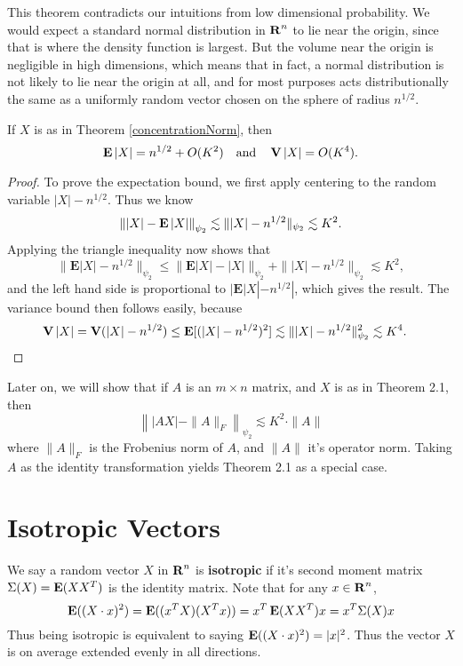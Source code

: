 This theorem contradicts our intuitions from low dimensional probability. We would expect a standard normal distribution in $\operatorname{\mathbf{R}}^n$ to lie near the origin, since that is where the density function is largest. But the volume near the origin is negligible in high dimensions, which means that in fact, a normal distribution is not likely to lie near the origin at all, and for most purposes acts distributionally the same as a uniformly random vector chosen on the sphere of radius $n^{1/2}$.

\begin{corollary}
    If $X$ is as in Theorem \ref{concentrationNorm}, then
    \[ \operatorname{\mathbf{E}} |X| = n^{1/2} + O(K^2)\quad\text{and}\quad\operatorname{\mathbf{V}} |X| = O(K^4). \]
\end{corollary}
\begin{proof}
    To prove the expectation bound, we first apply centering to the random variable $|X| - n^{1/2}$. Thus we know
    \[ \left\| |X| - \operatorname{\mathbf{E}} |X| \right\|_{\psi_2} \lesssim \| |X| - n^{1/2} \|_{\psi_2} \lesssim K^2. \]
    Applying the triangle inequality now shows that
    \[ \| \mathbf{E} |X| - n^{1/2} \|_{\psi_2} \leq \| \mathbf{E} |X| - |X| \|_{\psi_2} + \| |X| - n^{1/2} \|_{\psi_2} \lesssim K^2, \]
    and the left hand side is proportional to $| \mathbf{E} |X| - n^{1/2} |$, which gives the result. The variance bound then follows easily, because
    \begin{align*}
        \operatorname{\mathbf{V}} |X| &= \operatorname{\mathbf{V}}(|X| - n^{1/2}) \leq \operatorname{\mathbf{E}}[(|X| - n^{1/2})^2] \lesssim \| |X| - n^{1/2} \|_{\psi_2}^2 \lesssim K^4. \qedhere
    \end{align*}
\end{proof}

Later on, we will show that if $A$ is an $m \times n$ matrix, and $X$ is as in Theorem 2.1, then
%
\[ \left\| |AX| - \| A \|_F \right\|_{\psi_2} \lesssim K^2 \cdot \| A \| \]
%
where $\| A \|_F$ is the Frobenius norm of $A$, and $\| A \|$ it's operator norm. Taking $A$ as the identity transformation yields Theorem 2.1 as a special case.

\section{Isotropic Vectors}

We say a random vector $X$ in $\operatorname{\mathbf{R}}^n$ is \textbf{isotropic} if it's second moment matrix $\Sigma(X) = \operatorname{\mathbf{E}}(XX^T)$ is the identity matrix. Note that for any $x \in \operatorname{\mathbf{R}}^n$,
%
\[ \operatorname{\mathbf{E}}((X \cdot x)^2) = \operatorname{\mathbf{E}}((x^T X)(X^T x)) = x^T \operatorname{\mathbf{E}}(XX^T) x = x^T \Sigma(X) x \]
%
Thus being isotropic is equivalent to saying $\operatorname{\mathbf{E}}((X \cdot x)^2) = |x|^2$. Thus the vector $X$ is on average extended evenly in all directions.


